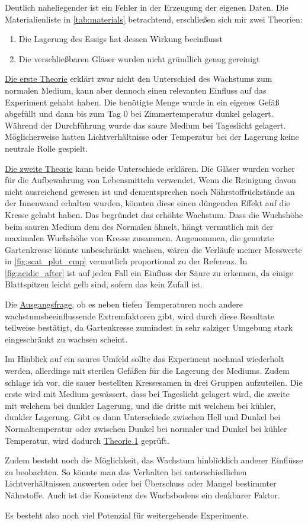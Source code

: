     Deutlich naheliegender ist ein Fehler in der Erzeugung der eigenen Daten. Die Materialienliste in \autoref{tab:materials} betrachtend, erschließen sich mir zwei Theorien:
    \begin{enumerate}[1.]
        \item \label{th:1} Die Lagerung des Essigs hat dessen Wirkung beeinflusst
        \item \label{th:2} Die verschließbaren Gläser wurden nicht gründlich genug gereinigt
    \end{enumerate} 
    \hyperref[th:1]{Die erste Theorie} erklärt zwar nicht den Unterschied des Wachstums zum normalen Medium, kann aber dennoch einen relevanten Einfluss auf das Experiment gehabt haben. Die benötigte Menge wurde in ein eigenes Gefäß abgefüllt und dann bis zum Tag 0 bei Zimmertemperatur dunkel gelagert. Während der Durchführung wurde das saure Medium bei Tageslicht gelagert. Möglicherweise hatten Lichtverhältnisse oder Temperatur bei der Lagerung keine neutrale Rolle gespielt.

    \hyperref[th:2]{Die zweite Theorie} kann beide Unterschiede erklären. Die Gläser wurden vorher für die Aufbewahrung von Lebensmitteln verwendet. Wenn die Reinigung davon nicht ausreichend gewesen ist und dementsprechen noch Nährstoffrückstände an der Innenwand erhalten wurden, könnten diese einen düngenden Effekt auf die Kresse gehabt haben. Das begründet das erhöhte Wachstum. Dass die Wuchshöhe beim sauren Medium dem des Normalen ähnelt, hängt vermutlich mit der maximalen Wuchshöhe von Kresse zusammen. Angenommen, die genutzte Gartenkresse könnte unbeschränkt wachsen, wären die Verläufe meiner Messwerte in \autoref{fig:scat_plot_cmp} vermutlich proportional zu der Referenz. In \autoref{fig:acidic_after} ist auf jeden Fall ein Einfluss der Säure zu erkennen, da einige Blattspitzen leicht gelb sind, sofern das kein Zufall ist.

    Die \hyperref[hypothese]{Ausgangsfrage}, ob es neben tiefen Temperaturen noch andere wachstumsbeeinflussende Extremfaktoren gibt, wird durch diese Resultate teilweise bestätigt, da Gartenkresse zumindest in sehr salziger Umgebung stark eingeschränkt zu wachsen scheint.

    Im Hinblick auf ein saures Umfeld sollte das Experiment nochmal wiederholt werden, allerdings mit sterilen Gefäßen für die Lagerung des Mediums. Zudem schlage ich vor, die sauer bestellten Kressesamen in drei Gruppen aufzuteilen. Die erste wird mit Medium gewässert, dass bei Tageslicht gelagert wird, die zweite mit welchem bei dunkler Lagerung, und die dritte mit welchem bei kühler, dunkler Lagerung. Gibt es dann Unterschiede zwischen Hell und Dunkel bei Normaltemperatur oder zwischen Dunkel bei normaler und Dunkel bei kühler Temperatur, wird dadurch \hyperref[th:1]{Theorie 1} geprüft.

    Zudem besteht noch die Möglichkeit, das Wachstum hinblicklich anderer Einflüsse zu beobachten. So könnte man das Verhalten bei unterschiedlichen Lichtverhältnissen auswerten oder bei Überschuss oder Mangel bestimmter Nährstoffe. Auch ist die Konsistenz des Wuchsbodens ein denkbarer Faktor.

    Es besteht also noch viel Potenzial für weitergehende Experimente.
